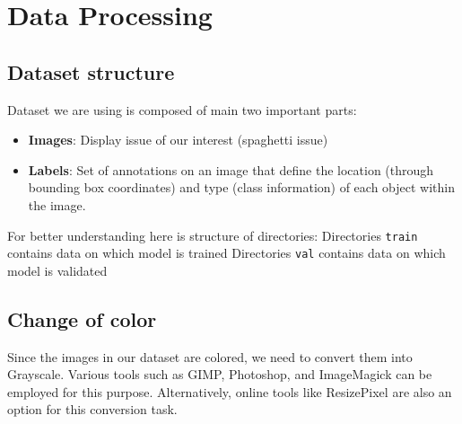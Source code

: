 \documentclass[12pt,a4paper]{article}
\begin{document}
\newpage

\section{Data Processing}
\subsection{Dataset structure}
Dataset we are using is composed of main two important parts:
\begin{itemize}
    \item \textbf{Images}: Display issue of our interest (spaghetti issue)
    
    \item \textbf{Labels}: Set of annotations on an image that define the location (through bounding box coordinates) and type (class information) of each object within the image. 
\end{itemize}
For better understanding here is structure of directories:
\smallbreak
{}
\medbreak
\noindent
Directories \verb|train| contains data on which model is trained 
\smallbreak
\noindent
Directories \verb|val| contains data on which model is validated 

\subsection{Change of color}
Since the images in our dataset are colored, we need to convert them into Grayscale. Various tools such as GIMP, Photoshop, and ImageMagick can be employed for this purpose. Alternatively, online tools like ResizePixel {\scriptsize\cite{imagesOnlineTool}} are also an option for this conversion task.
\end{document}
